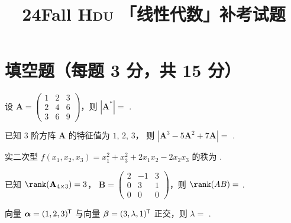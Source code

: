 \documentclass[fontset = fandol]{ctexart}
\title{\sffamily\bfseries 24Fall \textsc{Hdu} 「线性代数」补考试题}
\author{} \date{}
\newcommand*\mat[1]{\mathbf{#1}}
\newcommand*\trans[1]{#1^{\mkern-1.5mu\mathsf{T}}}
\begin{document}
\maketitle

\section{填空题（每题 3 分，共 15 分）}

\begin{problem}
  设 $\mat A =
  \begin{pmatrix}
    1 & 2 & 3\\
    2 & 4 & 6\\
    3 & 6 & 9
  \end{pmatrix}$，则 $|\mat A^*| =$ .
\end{problem}
\begin{solution}

\end{solution}

\begin{problem}
  已知 $3$ 阶方阵 $\mat A$ 的特征值为 $1$, $2$, $3$，
  则 $|\mat A^3 - 5\mat A^2 + 7\mat A| =$ .
\end{problem}
\begin{solution}
  
\end{solution}

\begin{problem}
  实二次型 $f(x_1,x_2,x_3) = x_1^2 + x_3^2 + 2x_1x_2 - 2x_2x_3$ 的秩为
  .
\end{problem}
\begin{solution}
  
\end{solution}

\begin{problem}
  已知 $\rank(\mat A_{4 \times 3}) = 3$，
  $\mat B =
  \begin{pmatrix}
    2 & -1 & 3\\
    0 &  3 & 1\\
    0 &  0 & 0
  \end{pmatrix}$，则 $\rank(AB) =$ .
\end{problem}
\begin{solution}
  
\end{solution}

\begin{problem}
  向量 $\bm\alpha = \trans{(1,2,3)}$
  与向量 $\bm\beta = \trans{(3,\lambda,1)}$ 正交，则 $\lambda =$ .
\end{problem}
\begin{solution}
  
\end{solution}
\end{document}
